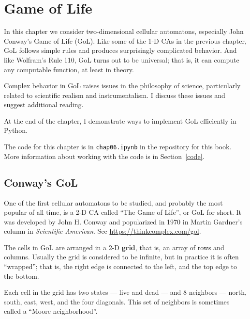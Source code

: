 \documentclass[12pt]{book}
\theoremstyle{exercise}
\begin{document}
\chapter{Game of Life}
\label{lifechap}

In this chapter we consider two-dimensional cellular automatons,
especially John Conway's Game of Life (GoL).  Like some of
the 1-D CAs in the previous chapter, GoL follows simple rules and
produces surprisingly complicated behavior.  And like Wolfram's
Rule 110, GoL turns out to be universal; that is, it can compute
any computable function, at least in theory.


Complex behavior in GoL raises issues in the philosophy of
science, particularly related to scientific realism and instrumentalism.
I discuss these issues and suggest additional reading.

At the end of the chapter, I demonstrate ways to implement
GoL efficiently in Python.

The code for this chapter is in {\tt chap06.ipynb} in the repository
for this book.  More information about working with the code is
in Section~\ref{code}.


\section{Conway's GoL}
\label{life}

One of the first cellular automatons to be studied, and probably the
most popular of all time, is a 2-D CA called ``The Game of Life'', or GoL
for short.  It was developed by John H. Conway and popularized in 1970
in Martin Gardner's column in {\em Scientific American}.
See \url{https://thinkcomplex.com/gol}.


The cells in GoL are arranged in a 2-D {\bf grid}, that is, an array of rows and columns.  Usually the grid is considered to be infinite, but in practice it is often ``wrapped''; that is, the right edge is connected to the left, and the top edge to the bottom.

Each cell in the grid has two states --- live and dead --- and 8 neighbors --- north, south, east, west, and the four diagonals.  This set of neighbors
is sometimes called a ``Moore neighborhood''.

\end{document}
